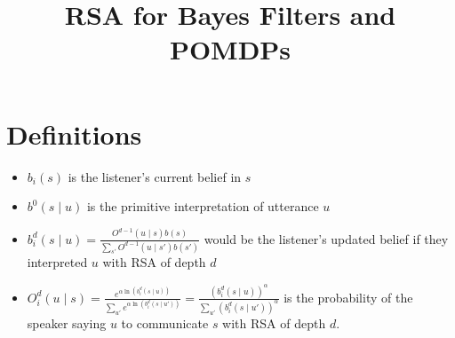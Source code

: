 \documentclass[12pt,fleqn,leqno,letterpaper]{article}
\title{RSA for Bayes Filters and POMDPs}
\newcommand\listener[4]{\ddfrac{O^{{#3}-1}({#2} \mid {#1})b({#1})}{\sum_{s'}O^{{#3}-1}({#2} \mid s')b(s')}}
\newcommand\speaker[4]{\ddfrac{e^{\alpha \ln(b_{#4}^{#3}({#1} \mid {#2}))}}{\sum_{u'}e^{\alpha \ln(b_{#4}^{#3}({#1} \mid u'))}}}
\newcommand\spkr[4]{\ddfrac{\left(b_{#4}^{#3}({#1} \mid {#2})\right)^{\alpha}}{\sum_{u'}\left(b_{#4}^{#3}({#1} \mid u')\right)^{\alpha}}}
\def\ddfrac#1#2{\displaystyle\frac{\displaystyle #1}{\displaystyle #2}}
\begin{document}
\maketitle

\section{Definitions}
\begin{itemize}
    \item $b_i(s)$ is the listener's current belief in $s$
    \item $b^0(s \mid u)$ is the primitive interpretation of utterance $u$
    \item $b_i^d(s \mid u) = \listener{s}{u}{d}{i}$ would be the listener's updated belief if they interpreted $u$ with RSA of depth $d$
    \item $O_i^d(u \mid s) = \speaker{s}{u}{d}{i} = \spkr{s}{u}{d}{i}$ is the probability of the speaker saying $u$ to communicate $s$ with RSA of depth $d$.
\end{itemize}
\end{document}
